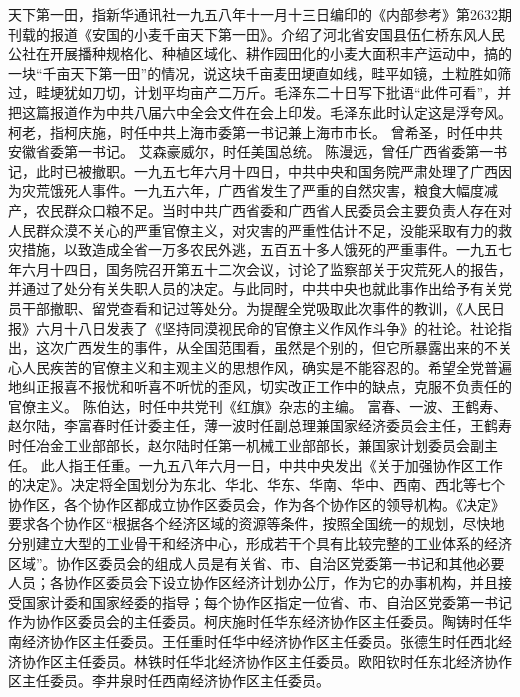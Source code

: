 \begin{maonote}
天下第一田，指新华通讯社一九五八年十一月十三日编印的《内部参考》第2632期刊载的报道《安国的小麦千亩天下第一田》。介绍了河北省安国县伍仁桥东风人民公社在开展播种规格化、种植区域化、耕作园田化的小麦大面积丰产运动中，搞的一块“千亩天下第一田”的情况，说这块千亩麦田埂直如线，畦平如镜，土粒胜如筛过，畦埂犹如刀切，计划平均亩产二万斤。毛泽东二十日写下批语“此件可看”，并把这篇报道作为中共八届六中全会文件在会上印发。毛泽东此时认定这是浮夸风。
柯老，指柯庆施，时任中共上海市委第一书记兼上海市市长。
曾希圣，时任中共安徽省委第一书记。
艾森豪威尔，时任美国总统。
陈漫远，曾任广西省委第一书记，此时已被撤职。一九五七年六月十四日，中共中央和国务院严肃处理了广西因为灾荒饿死人事件。一九五六年，广西省发生了严重的自然灾害，粮食大幅度减产，农民群众口粮不足。当时中共广西省委和广西省人民委员会主要负责人存在对人民群众漠不关心的严重官僚主义，对灾害的严重性估计不足，没能采取有力的救灾措施，以致造成全省一万多农民外逃，五百五十多人饿死的严重事件。一九五七年六月十四日，国务院召开第五十二次会议，讨论了监察部关于灾荒死人的报告，并通过了处分有关失职人员的决定。与此同时，中共中央也就此事作出给予有关党员干部撤职、留党查看和记过等处分。为提醒全党吸取此次事件的教训，《人民日报》六月十八日发表了《坚持同漠视民命的官僚主义作风作斗争》的社论。社论指出，这次广西发生的事件，从全国范围看，虽然是个别的，但它所暴露出来的不关心人民疾苦的官僚主义和主观主义的思想作风，确实是不能容忍的。希望全党普遍地纠正报喜不报忧和听喜不听忧的歪风，切实改正工作中的缺点，克服不负责任的官僚主义。
陈伯达，时任中共党刊《红旗》杂志的主编。
富春、一波、王鹤寿、赵尔陆，李富春时任计委主任，薄一波时任副总理兼国家经济委员会主任，王鹤寿时任冶金工业部部长，赵尔陆时任第一机械工业部部长，兼国家计划委员会副主任。
此人指王任重。一九五八年六月一日，中共中央发出《关于加强协作区工作的决定》。决定将全国划分为东北、华北、华东、华南、华中、西南、西北等七个协作区，各个协作区都成立协作区委员会，作为各个协作区的领导机构。《决定》要求各个协作区“根据各个经济区域的资源等条件，按照全国统一的规划，尽快地分别建立大型的工业骨干和经济中心，形成若干个具有比较完整的工业体系的经济区域”。协作区委员会的组成人员是有关省、市、自治区党委第一书记和其他必要人员；各协作区委员会下设立协作区经济计划办公厅，作为它的办事机构，并且接受国家计委和国家经委的指导；每个协作区指定一位省、市、自治区党委第一书记作为协作区委员会的主任委员。柯庆施时任华东经济协作区主任委员。陶铸时任华南经济协作区主任委员。王任重时任华中经济协作区主任委员。张德生时任西北经济协作区主任委员。林铁时任华北经济协作区主任委员。欧阳钦时任东北经济协作区主任委员。李井泉时任西南经济协作区主任委员。

\end{maonote}
